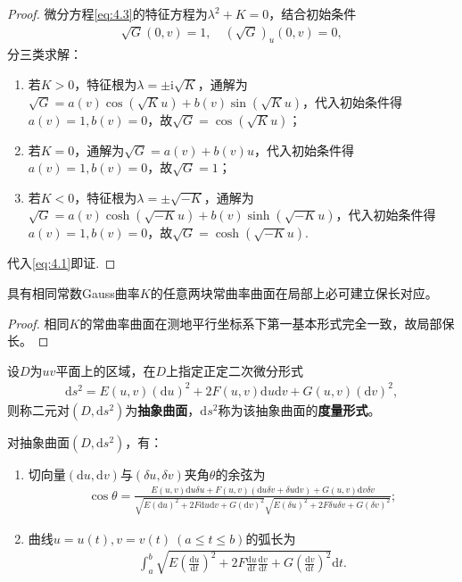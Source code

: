 \documentclass[../../main.tex]{subfiles}%
\begin{document}
\begin{proof}
微分方程\eqref{eq:4.3}的特征方程为$\lambda^2+K=0$，结合初始条件
\begin{align}
\sqrt{G}(0,v)=1,\quad (\sqrt{G})_u(0,v)=0,\label{eq:4.4}
\end{align}
分三类求解：
\begin{enumerate}[(1)]
\item 若$K>0$，特征根为$\lambda=\pm\mathrm{i}\sqrt{K}$，通解为$\sqrt{G}=a(v)\cos(\sqrt{K}u)+b(v)\sin(\sqrt{K}u)$，代入初始条件得$a(v)=1,b(v)=0$，故$\sqrt{G}=\cos(\sqrt{K}u)$；
\item 若$K=0$，通解为$\sqrt{G}=a(v)+b(v)u$，代入初始条件得$a(v)=1,b(v)=0$，故$\sqrt{G}=1$；
\item 若$K<0$，特征根为$\lambda=\pm\sqrt{-K}$，通解为$\sqrt{G}=a(v)\cosh(\sqrt{-K}u)+b(v)\sinh(\sqrt{-K}u)$，代入初始条件得$a(v)=1,b(v)=0$，故$\sqrt{G}=\cosh(\sqrt{-K}u)$.
\end{enumerate}
代入\eqref{eq:4.1}即证.
\end{proof}

\begin{theorem}
具有相同常数Gauss曲率$K$的任意两块常曲率曲面在局部上必可建立保长对应。
\end{theorem}

\begin{proof}
相同$K$的常曲率曲面在测地平行坐标系下第一基本形式完全一致，故局部保长。
\end{proof}

\begin{definition}
设$D$为$uv$平面上的区域，在$D$上指定正定二次微分形式
\begin{align}
\mathrm{d}s^2=E(u,v)(\mathrm{d}u)^2+2F(u,v)\mathrm{d}u\mathrm{d}v+G(u,v)(\mathrm{d}v)^2,\label{eq:4.5}
\end{align}
则称二元对$(D,\mathrm{d}s^2)$为\textbf{抽象曲面}，$\mathrm{d}s^2$称为该抽象曲面的\textbf{度量形式}。
\end{definition}

\begin{proposition}
对抽象曲面$(D,\mathrm{d}s^2)$，有：
\begin{enumerate}[(1)]
\item 切向量$(\mathrm{d}u,\mathrm{d}v)$与$(\delta u,\delta v)$夹角$\theta$的余弦为
\begin{align}
\cos\theta=\frac{E(u,v)\mathrm{d}u\delta u+F(u,v)(\mathrm{d}u\delta v+\delta u\mathrm{d}v)+G(u,v)\mathrm{d}v\delta v}{\sqrt{E(\mathrm{d}u)^2+2F\mathrm{d}u\mathrm{d}v+G(\mathrm{d}v)^2}\sqrt{E(\delta u)^2+2F\delta u\delta v+G(\delta v)^2}};\label{eq:4.6}
\end{align}
\item 曲线$u=u(t),v=v(t)\ (a\leqslant t\leqslant b)$的弧长为
\begin{align}
\int_{a}^{b}\sqrt{E\left(\frac{\mathrm{d}u}{\mathrm{d}t}\right)^2+2F\frac{\mathrm{d}u}{\mathrm{d}t}\frac{\mathrm{d}v}{\mathrm{d}t}+G\left(\frac{\mathrm{d}v}{\mathrm{d}t}\right)^2}\mathrm{d}t.\label{eq:4.7}
\end{align}
\end{enumerate}
\end{proposition}
\end{document}
